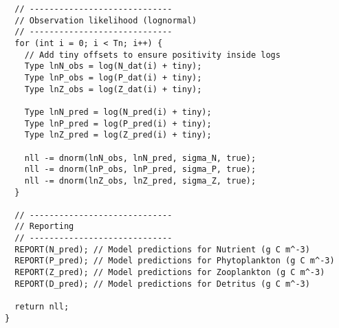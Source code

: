 \begin{lstlisting}
  // -----------------------------
  // Observation likelihood (lognormal)
  // -----------------------------
  for (int i = 0; i < Tn; i++) {
    // Add tiny offsets to ensure positivity inside logs
    Type lnN_obs = log(N_dat(i) + tiny);
    Type lnP_obs = log(P_dat(i) + tiny);
    Type lnZ_obs = log(Z_dat(i) + tiny);

    Type lnN_pred = log(N_pred(i) + tiny);
    Type lnP_pred = log(P_pred(i) + tiny);
    Type lnZ_pred = log(Z_pred(i) + tiny);

    nll -= dnorm(lnN_obs, lnN_pred, sigma_N, true);
    nll -= dnorm(lnP_obs, lnP_pred, sigma_P, true);
    nll -= dnorm(lnZ_obs, lnZ_pred, sigma_Z, true);
  }

  // -----------------------------
  // Reporting
  // -----------------------------
  REPORT(N_pred); // Model predictions for Nutrient (g C m^-3)
  REPORT(P_pred); // Model predictions for Phytoplankton (g C m^-3)
  REPORT(Z_pred); // Model predictions for Zooplankton (g C m^-3)
  REPORT(D_pred); // Model predictions for Detritus (g C m^-3)

  return nll;
}
\end{lstlisting}

